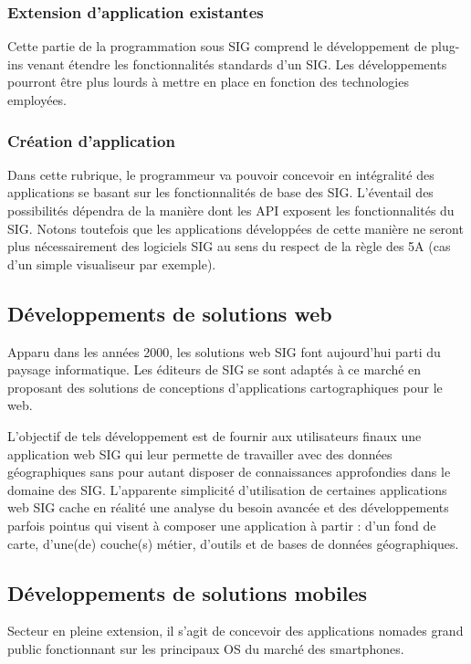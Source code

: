 \documentclass[11pt]{article}
\begin{document}
\subsubsection{Extension d'application existantes}
Cette partie de la programmation sous SIG comprend le développement de plug-ins venant étendre les fonctionnalités standards d'un SIG. Les développements pourront être plus lourds à mettre en place en fonction des technologies employées.


\subsubsection{Création d'application}
Dans cette rubrique, le programmeur va pouvoir concevoir en intégralité des applications se basant sur les fonctionnalités de base des SIG. L'éventail des possibilités dépendra de la manière dont les API exposent les fonctionnalités du SIG.
Notons toutefois que les applications développées de cette manière ne seront plus nécessairement des logiciels SIG au sens du respect de la règle des 5A (cas d'un simple visualiseur par exemple).



\subsection{Développements de solutions web}
Apparu dans les années 2000, les solutions web SIG font aujourd'hui parti du paysage informatique. Les éditeurs de SIG se sont adaptés à ce marché en proposant des solutions de conceptions d'applications cartographiques pour le web.

L'objectif de tels développement est de fournir aux utilisateurs finaux une application web SIG qui leur permette de travailler avec des données géographiques sans pour autant disposer de connaissances approfondies dans le domaine des SIG. L'apparente simplicité d'utilisation de certaines applications web SIG cache en réalité une analyse du besoin avancée et des développements parfois pointus qui visent à composer une application à partir : d'un fond de carte, d'une(de) couche(s) métier, d'outils et de bases de données géographiques.

\subsection{Développements de solutions mobiles}
Secteur en pleine extension, il s'agit de concevoir des applications nomades grand public fonctionnant sur les principaux OS du marché des smartphones.
\end{document}
